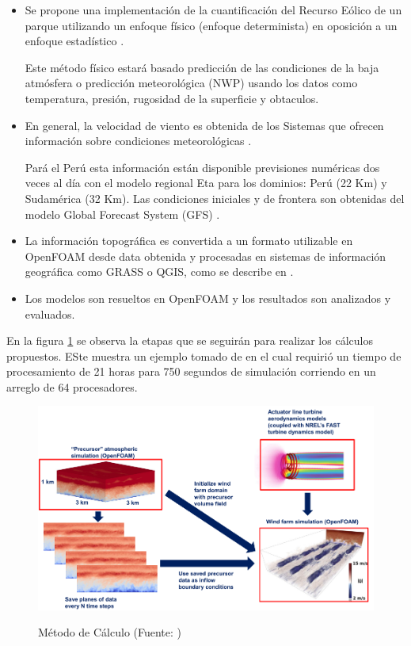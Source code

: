 
\begin{itemize}
	\item Se propone una implementación de la cuantificación del Recurso Eólico de un parque  utilizando un enfoque físico (enfoque determinista) en oposición a un enfoque estadístico \citep*{wang_review_2011}.

Este método físico estará basado predicción de las condiciones de la baja atmósfera o predicción meteorológica  (NWP) usando los datos como temperatura, presión, rugosidad de la superficie y obtaculos.

\item En general, la velocidad de viento es obtenida de los Sistemas que ofrecen información sobre condiciones meteorológicas \citep*{wang_review_2011}. 

Pará el Perú esta información están disponible previsiones numéricas dos veces al día con el modelo regional Eta para los dominios: Perú (22 Km) y Sudamérica (32 Km). Las condiciones iniciales y de frontera son obtenidas del modelo Global Forecast System (GFS) \citep{senamhi_servicio_????}. 

\item La información topográfica es convertida a un formato utilizable en OpenFOAM desde data obtenida y procesadas en sistemas de información geográfica como GRASS o QGIS, como se describe en \citep{hardin_how_2013}.

\item Los modelos son resueltos en OpenFOAM y los resultados son analizados y evaluados.
\end{itemize}

En la figura \ref{fig:metodo} se observa la etapas que se seguirán para realizar los cálculos propuestos. ESte muestra un ejemplo tomado de \citep{stull_introduction_2012} en el cual requirió un tiempo de procesamiento de 21 horas para 750 segundos de simulación corriendo en un arreglo de 64 procesadores.

\begin{figure}[h!]
\centering
\includegraphics[width=0.8\linewidth]{imagenes/metodo}
\caption[Metodo de Cálculo]{Método de Cálculo (Fuente: \citep{stull_introduction_2012})}{}
\label{fig:metodo}
\end{figure}




